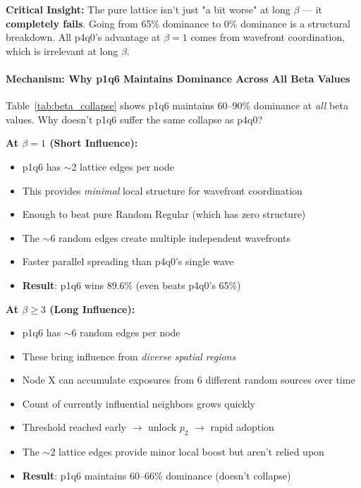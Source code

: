 \documentclass[12pt,a4paper]{article}
\begin{document}
\textbf{Critical Insight:}
The pure lattice isn't just "a bit worse" at long $\beta$ --- it \textbf{completely fails}. Going from 65\% dominance to 0\% dominance is a structural breakdown. All p4q0's advantage at $\beta=1$ comes from wavefront coordination, which is irrelevant at long $\beta$.

\paragraph{Mechanism: Why p1q6 Maintains Dominance Across All Beta Values}

Table~\ref{tab:beta_collapse} shows p1q6 maintains 60--90\% dominance at \textit{all} beta values. Why doesn't p1q6 suffer the same collapse as p4q0?

\textbf{At $\beta=1$ (Short Influence):}
\begin{itemize}
    \item p1q6 has $\sim$2 lattice edges per node
    \item This provides \textit{minimal} local structure for wavefront coordination
    \item Enough to beat pure Random Regular (which has zero structure)
    \item The $\sim$6 random edges create multiple independent wavefronts
    \item Faster parallel spreading than p4q0's single wave
    \item \textbf{Result}: p1q6 wins 89.6\% (even beats p4q0's 65\%)
\end{itemize}

\textbf{At $\beta \geq 3$ (Long Influence):}
\begin{itemize}
    \item p1q6 has $\sim$6 random edges per node
    \item These bring influence from \textit{diverse spatial regions}
    \item Node X can accumulate exposures from 6 different random sources over time
    \item Count of currently influential neighbors grows quickly
    \item Threshold reached early $\to$ unlock $p_2$ $\to$ rapid adoption
    \item The $\sim$2 lattice edges provide minor local boost but aren't relied upon
    \item \textbf{Result}: p1q6 maintains 60--66\% dominance (doesn't collapse)
\end{itemize}
\end{document}

